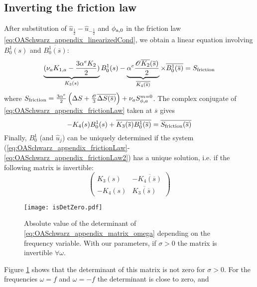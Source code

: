 \subsection{Inverting the friction law}
After substitution of $\widehat{u}_{\frac{1}{2}}
- \widehat{u}_{-\frac{1}{2}}$ and $\phi_{{\rm a}, 0}$ in
the friction law \eqref{eq:OASchwarz_appendix_linearizedCond}, we
obtain a linear equation involving $B^1_0(s)$ and
$\overline{B^1_0(\overline{s})}$:
\begin{equation}
	\label{eq:OASchwarz_appendix_frictionLaw}
	\underbrace{(\nu_a K_{1,a} - \frac{3\alpha^e K_{2}}{2})}_{
		K_3(s)
	}B^1_0(s)
	-\underbrace{
		\alpha^e \frac{{\cal O} \overline{K_2}(\overline{s})}{2}}_{
		\overline{K_4(\overline{s})}}
	\times \overline{B^1_0(\overline{s})}
	= S_{\rm friction}
\end{equation}
where $S_{\rm friction} =
	\frac{3\alpha^e}{2} \left(
	\Delta S + \frac{\cal O}{3}
	\overline{\Delta S(\overline{s})}\right)
	+\nu_a S_{\phi,a}^{m=0}$.
The complex conjugate of \eqref{eq:OASchwarz_appendix_frictionLaw}
taken at $\overline{s}$ gives
\begin{equation}
\label{eq:OASchwarz_appendix_frictionLaw2}
	- K_4(s)B^1_0(s) +
	\overline{K_3(\overline{s}) B^1_0(\overline{s})} =
	\overline{S_{\rm friction}(\overline{s})}
\end{equation}
Finally, $B^1_0$  (and $\widehat{u}_j$) can be uniquely determined
if the system
(\ref{eq:OASchwarz_appendix_frictionLaw}-\ref{eq:OASchwarz_appendix_frictionLaw2})
has a unique solution, i.e. if the following matrix is invertible:
\begin{equation}
	\label{eq:OASchwarz_appendix_matrix_omega}
	\begin{pmatrix}
		K_3(s)& - \overline{K_4(\overline{s})}\\
		-K_4(s) & \overline{K_3(\overline{s})}
	\end{pmatrix}
\end{equation}
\begin{figure}
    \centering
    \texttt{[image: isDetZero.pdf]}
    \caption{Absolute value of the determinant of
	\eqref{eq:OASchwarz_appendix_matrix_omega} depending on
	the frequency variable. With our parameters,
	if $\sigma>0$ the matrix is invertible $\forall \omega$.}
    \label{fig:OASchwarz_isDetZero}
\end{figure}
Figure \ref{fig:OASchwarz_isDetZero} shows that the determinant of
this matrix is not zero for $\sigma>0$. For the frequencies
$\omega=f$ and $\omega=-f$ the determinant is close to zero, and
